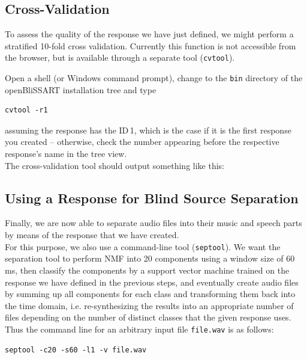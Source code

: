 \subsection{Cross-Validation}

To assess the quality of the response we have just defined, we might perform a
stratified 10-fold cross validation. Currently this function is not accessible
from the browser, but is available through a separate tool ({\tt cvtool}).

Open a shell (or Windows command prompt), change to the {\tt bin} directory of
the openBliSSART installation tree and type

\begin{verbatim}
cvtool -r1
\end{verbatim}

\noindent assuming the response has the ID\,1, which is the case if it is the first
response you created -- otherwise, check the number appearing before the
respective response's name in the tree view.\\
The cross-validation tool should output something like this:




\subsection{Using a Response for Blind Source Separation}

Finally, we are now able to separate audio files into their music and speech
parts by means of the response that we have created.\\

For this purpose, we also use a command-line tool ({\tt septool}). We want the
separation tool to perform NMF into 20 components using a window size of 60\,ms,
then classify the components by a support vector machine trained on the response
we have defined in the previous steps, and eventually create audio files by
summing up all components for each class and transforming them back into the
time domain, i.e. re-synthesizing the results into an appropriate number of
files depending on the number of distinct classes that the given response
uses. Thus the command line for an arbitrary input file \verb|file.wav| is as
follows:

\begin{verbatim}
septool -c20 -s60 -l1 -v file.wav
\end{verbatim}

